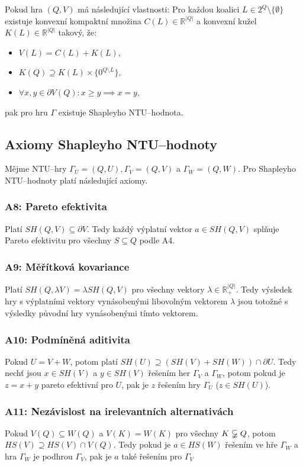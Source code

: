         Pokud hra $(Q, V)$ má následující vlastnosti: Pro každou koalici $L \in 2^Q \setminus \{\emptyset\}$ existuje konvexní kompaktní množina $C(L) \in \mathbb{R}^{|Q|}$ a konvexní kužel $K(L) \in \mathbb{R}^{|Q|}$ takový, že:
        \begin{itemize}
            \item $V(L) = C(L) + K(L)$,
            \item $K(Q) \supseteq K(L) \times \{0^{Q\setminus L}\}$,
            \item $\forall x, y \in \partial V(Q): x \geqslant y \implies x = y$,
        \end{itemize}
        pak pro hru $\Gamma$ existuje Shapleyho NTU--hodnota.

    \subsection{Axiomy Shapleyho NTU--hodnoty}
        Mějme NTU--hry $\Gamma_U = (Q, U), \Gamma_V = (Q, V)$ a $\Gamma_W = (Q, W)$. Pro Shapleyho NTU--hodnoty platí následující axiomy.

        \subsubsection*{A8: Pareto efektivita}
            Platí $SH(Q, V) \subseteq \partial V$. Tedy každý výplatní vektor $a \in SH(Q, V)$ splňuje Pareto efektivitu pro všechny $S \subseteq Q$ podle A4.

        \subsubsection*{A9: Měřítková kovariance}
            Platí $SH(Q, \lambda V) = \lambda SH(Q, V)$ pro všechny vektory $\lambda \in \mathbb{R}^{|Q|}_{+}$. Tedy výsledek hry s výplatními vektory vynásobenými libovolným vektorem $\lambda$ jsou totožné s výsledky původní hry vynásobenými tímto vektorem.

        \subsubsection*{A10: Podmíněná aditivita}
            Pokud $U = V + W$, potom platí $SH(U) \supseteq (SH(V) + SH(W)) \cap \partial U$. Tedy nechť jsou $x \in SH(V)$ a $y \in SH(V)$ řešením her $\Gamma_V$ a $\Gamma_W$, potom pokud je $z = x + y$ pareto efektivní pro $U$, pak je $z$ řešením hry $\Gamma_U$ ($z \in SH(U)$).
        \subsubsection*{A11: Nezávislost na irelevantních alternativách}
            Pokud $V(Q) \subseteq W(Q)$ a $V(K) = W(K)$ pro všechny $K \varsubsetneqq Q$, potom $HS(V) \supseteq HS(V) \cap V(Q)$. Tedy pokud je $a \in HS(W)$ řešením ve hře $\Gamma_W$ a hra $\Gamma_W$ je podhrou $\Gamma_V$, pak je $a$ také řešením pro $\Gamma_V$
